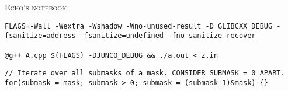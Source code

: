 \documentclass[a4paper,10pt]{article}
\begin{document}
\begin{center}
    \LARGE \textsc{Echo's notebook}
\end{center}
\vspace{0 pt}


\begin{verbatim}
FLAGS=-Wall -Wextra -Wshadow -Wno-unused-result -D_GLIBCXX_DEBUG -fsanitize=address -fsanitize=undefined -fno-sanitize-recover

@g++ A.cpp $(FLAGS) -DJUNCO_DEBUG && ./a.out < z.in
\end{verbatim}

\begin{verbatim}
// Iterate over all submasks of a mask. CONSIDER SUBMASK = 0 APART.
for(submask = mask; submask > 0; submask = (submask-1)&mask) {}
\end{verbatim}
\end{document}
